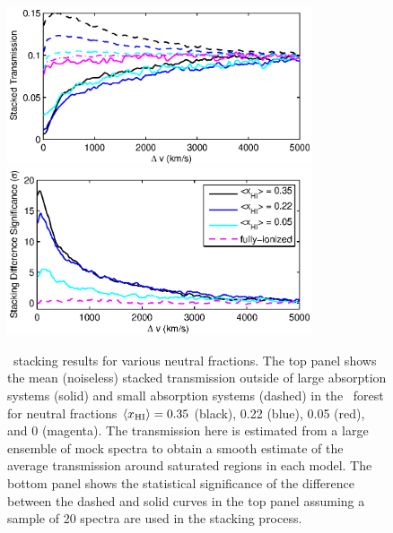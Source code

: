 \begin{figure}[!ht]
  \centering
  \includegraphics[width=9cm]{fig6a.eps}
  \includegraphics[width=9cm]{fig6b.eps}
  \caption{\lya\ stacking results for various neutral fractions. The top panel shows the mean (noiseless) stacked transmission outside of large absorption systems (solid) and small absorption systems (dashed) in the \lya\ forest for neutral fractions $\langle x_{\text{HI}}\rangle = 0.35$ (black), 0.22 (blue), 0.05 (red), and 0 (magenta). The transmission here is estimated from a large ensemble of mock spectra to obtain a smooth estimate
  of the average transmission around saturated regions in each model. 
  The bottom panel shows the statistical significance of the difference between the dashed and solid curves in the top panel assuming a sample of 20 spectra are used in the stacking process.}
  \label{fig:LyaResults}
\end{figure}


